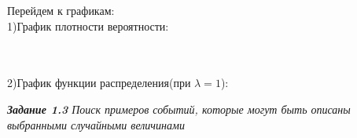 \documentclass[a4paper,12pt, oneside]{article}
\begin{document}
	\vspace{\baselineskip}
	Перейдем к графикам:
	\vspace{\baselineskip}\\	
	1)График плотности вероятности:

	\begin{minipage}[h]{0.55\linewidth}
	\end{minipage}
	\\
	\vspace{\baselineskip}\\
	
	2)График функции распределения(при $\lambda = 1$):\\
	\begin{minipage}[h]{0.55\linewidth}	
	\end{minipage}
	
	
	
	
\vspace{13mm}%
\textit{\textbf{Задание 1.3} Поиск примеров событий, которые могут быть описаны выбранными случайными величинами}
\vspace{13mm}
\end{document}
